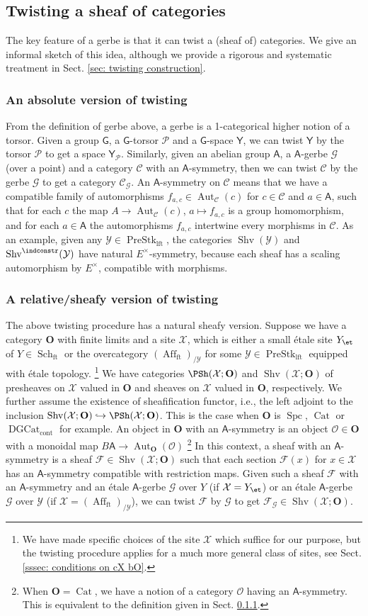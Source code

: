 \documentclass[10pt]{amsart}
\newcommand{\sssec}{\subsubsection}
\theoremstyle{remark}
\newcommand{\cP}{\mathcal{P}}
\newcommand{\on}{\operatorname}
\newcommand{\cC}{\mathcal{C}}
\newcommand{\cF}{\mathcal{F}}
\newcommand{\cG}{\mathcal{G}}
\newcommand{\cO}{\mathcal{O}}
\newcommand{\cX}{\mathcal{X}}
\newcommand{\cY}{\mathcal{Y}}
\newcommand{\Cat}{\on{Cat}}
\newcommand{\DGcat}{\on{DGCat}_{\on{cont}}}
\newcommand{\Shv}{\on{Shv}}
\newcommand{\PreStklft}{\on{PreStk}_{\on{lft}}}
\newcommand{\Affft}{\on{Aff}_{\on{ft}}}
\newcommand{\Schft}{\on{Sch}_{\on{ft}}}
\newcommand{\Spc}{\on{Spc}}
\DeclareMathOperator{\Aut}{Aut}
\newcommand{\bO}{\mathbf{O}}
\newcommand{\sfA}{\mathsf{A}}
\begin{document}
\subsection{Twisting a sheaf of categories}\label{ssec: twisting a sheaf of categories}
The key feature of a gerbe is that it can twist a (sheaf of) categories. We give an informal sketch of this idea, although we provide a rigorous and systematic treatment in Sect. \ref{sec: twisting construction}.

\sssec{An absolute version of twisting}\label{sssec: twisting absolute}
From the definition of gerbe above, a gerbe is a 1-categorical higher notion of a torsor. Given a group $\mathsf{G}$, a $\mathsf{G}$-torsor $\cP$ and a $\mathsf{G}$-space $\mathsf{Y}$, we can twist $\mathsf{Y}$ by the torsor $\cP$ to get a space $\mathsf{Y}_{\cP}$. Similarly, given an abelian group $\mathsf{A}$, a $\mathsf{A}$-gerbe $\cG$ (over a point) and a category $\cC$ with an $\sfA$-symmetry, then we can twist $\cC$ by the gerbe $\cG$ to get a category $\cC_{\cG}$. An $\mathsf{A}$-symmetry on $\cC$ means that we have a compatible family of automorphisms $f_{a,c}\in\Aut_{\cC}(c)$ for $c\in \cC$ and $a\in \sfA$, such that for each $c$ the map $A\rightarrow \Aut_{\cC}(c)$, $a\mapsto f_{a,c}$ is a group homomorphism, and for each $a\in \sfA$ the automorphisms $f_{a,c}$ intertwine every morphisms in $\cC$. As an example, given any $\cY\in\PreStklft$, the categories $\Shv(\cY)$ and $\Shv^{\indconstr}(\cY)$ have natural $E^{\times}$-symmetry, because each sheaf has a scaling automorphism by $E^{\times}$, compatible with morphisms.

\sssec{A relative/sheafy version of twisting}\label{sssec: sheafy twisting}
The above twisting procedure  has a natural sheafy version. Suppose we have a category $\bO$ with finite limits and a site $\cX$, which is either a small \'etale site $Y_{\et}$ of $Y\in\Schft$ or the overcategory $(\Affft)_{/\cY}$ for some $\cY\in\PreStklft$ equipped with \'etale topology. \footnote{We have made specific choices of the site $\cX$ which suffice for our purpose, but the twisting procedure applies for a much more general class of sites, see Sect. \ref{sssec: conditions on cX bO}.} We have categories $\PSh(\cX;\bO)$ and $\Shv(\cX;\bO)$ of presheaves on $\cX$ valued in $\bO$ and sheaves on $\cX$ valued in $\bO$, respectively. We further assume the existence of sheafification functor, i.e., the left adjoint to the inclusion $\Shv(\cX;\bO)\hookrightarrow \PSh(\cX;\bO)$. This is the case when $\bO$ is $\Spc$, $\Cat$ or $\DGcat$ for example. An object in $\bO$ with an $\sfA$-symmetry is an object $\cO\in\bO$ with a monoidal map $B\sfA\rightarrow \Aut_{\bO}(\cO)$ \footnote{When $\bO=\Cat$, we have a notion of a category $\cO$ having an $\sfA$-symmetry. This is equivalent to the definition given in Sect. \ref{sssec: twisting absolute}.}
In this context, a sheaf with an $\sfA$-symmetry is a sheaf $\cF\in \Shv(\cX;\bO)$ such that each section $\cF(x)$ for $x\in\cX$ has an $\sfA$-symmetry compatible with restriction maps. Given such a sheaf $\cF$ with an $\sfA$-symmetry and an \'etale $\sfA$-gerbe $\cG$ over $Y$ (if $\cX=Y_{\et}$) or an \'etale $\sfA$-gerbe $\cG$ over $\cY$ (if $\cX=(\Affft)_{/\cY}$), we can twist $\cF$ by $\cG$ to get $\cF_{\cG}\in \Shv(\cX;\bO)$.
\end{document}
